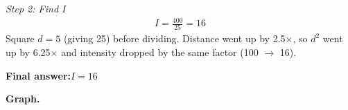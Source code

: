 \documentclass[11pt]{article}
\begin{document}
\textit{Step 2: Find I}
\[\begin{gathered}
I = \frac{400}{25} = 16
\end{gathered}\]
Square \( d = 5 \) (giving 25) before dividing. Distance went up by 2.5$\times$, so \( d^2 \) went up by 6.25$\times$ and intensity dropped by the same factor (100 $\to$ 16).

\begin{answerbox}
\textbf{Final answer:}\quad \(\displaystyle I = 16\)
\end{answerbox}
\textbf{Graph.}

\begin{center}
\end{center}
\end{document}
